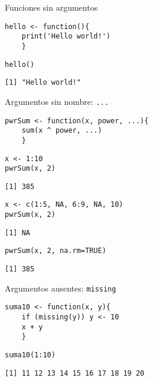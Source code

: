 \documentclass[xcolor={usenames,svgnames,dvipsnames}]{beamer}
\begin{document}
\begin{frame}[fragile,label=sec-1-7]{Funciones sin argumentos}
 \lstset{language=R,numbers=none}
\begin{lstlisting}
hello <- function(){
    print('Hello world!')
    }
\end{lstlisting}

\lstset{language=R,numbers=none}
\begin{lstlisting}
hello()
\end{lstlisting}

\begin{verbatim}
[1] "Hello world!"
\end{verbatim}
\end{frame}
\begin{frame}[fragile,label=sec-1-8]{Argumentos sin nombre: \texttt{...}}
 \lstset{language=R,numbers=none}
\begin{lstlisting}
pwrSum <- function(x, power, ...){
    sum(x ^ power, ...)
    }
\end{lstlisting}

\lstset{language=R,numbers=none}
\begin{lstlisting}
x <- 1:10
pwrSum(x, 2)
\end{lstlisting}

\begin{verbatim}
[1] 385
\end{verbatim}

\lstset{language=R,numbers=none}
\begin{lstlisting}
x <- c(1:5, NA, 6:9, NA, 10)
pwrSum(x, 2)
\end{lstlisting}

\begin{verbatim}
[1] NA
\end{verbatim}

\lstset{language=R,numbers=none}
\begin{lstlisting}
pwrSum(x, 2, na.rm=TRUE)
\end{lstlisting}

\begin{verbatim}
[1] 385
\end{verbatim}
\end{frame}
\begin{frame}[fragile,label=sec-1-9]{Argumentos ausentes: \texttt{missing}}
 \lstset{language=R,numbers=none}
\begin{lstlisting}
suma10 <- function(x, y){
    if (missing(y)) y <- 10
    x + y
    }
\end{lstlisting}

\lstset{language=R,numbers=none}
\begin{lstlisting}
suma10(1:10)
\end{lstlisting}

\begin{verbatim}
[1] 11 12 13 14 15 16 17 18 19 20
\end{verbatim}
\end{frame}
\end{document}
